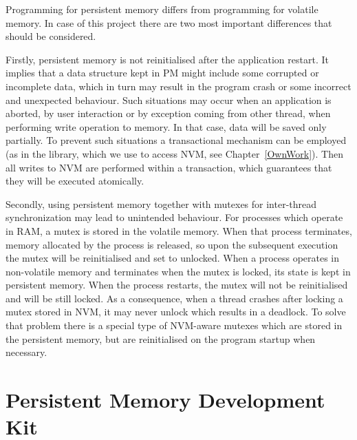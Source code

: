     
        Programming for persistent memory differs from programming for volatile memory. 
        In case of this project there are two most important differences that should be considered.
        
        Firstly, persistent memory is not reinitialised after the application restart. It implies that a data structure kept in PM might include some corrupted or incomplete data, which in turn may result in the program crash or some incorrect and unexpected behaviour. Such situations may occur when an application is aborted, by user interaction or by exception coming from other thread, when performing write operation to memory. In that case, data will be saved only partially. To prevent such situations a transactional mechanism can be employed (as in the \libpmemobj library, which we use to access NVM, see Chapter~\ref{OwnWork}). Then all writes to NVM are performed within a transaction, which guarantees that they will be executed atomically.
        
        Secondly, using persistent memory together with mutexes for inter-thread synchronization may lead to unintended behaviour. 
        For processes which operate in RAM, a mutex is stored in the volatile memory. When that process terminates, memory allocated by the process is released, so upon the subsequent execution the mutex will be reinitialised and set to unlocked. When a process operates in non-volatile memory and terminates when the mutex is locked, its state is kept in persistent memory. When the process
        restarts, the mutex will not be reinitialised and will be still locked. As a consequence, when a thread crashes after locking a mutex stored in NVM, it may never unlock which results in a deadlock. To solve that problem there is a special type of NVM-aware mutexes which are stored in the persistent memory, but are reinitialised on the program startup when necessary. 
      
\section{Persistent Memory Development Kit}

